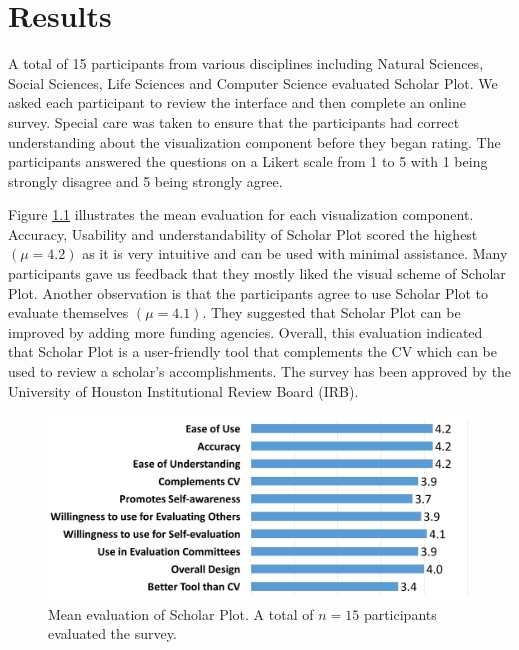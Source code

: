 \chapter{Results}\label{chap:Results}

A total of 15 participants from various disciplines including Natural Sciences, Social Sciences, Life Sciences and Computer Science evaluated Scholar Plot. We asked each participant to review the interface and then complete an online survey. Special care was taken to ensure that the participants had correct understanding about the visualization component before they began rating. The participants answered the questions on a Likert scale from 1 to 5 with 1 being strongly disagree and 5 being strongly agree.

Figure \ref{fig:UserStudy} illustrates the mean evaluation for each visualization component. Accuracy, Usability and understandability of Scholar Plot scored the highest $(\mu = 4.2)$ as it is very intuitive and can be used with minimal assistance. Many participants gave us feedback that they mostly liked the visual scheme of Scholar Plot. Another observation is that the participants agree to use Scholar Plot to evaluate themselves $(\mu = 4.1)$. They suggested that Scholar Plot can be improved by adding more funding agencies. Overall, this evaluation indicated that Scholar Plot is a user-friendly tool that complements the CV which can be used to review a scholar's accomplishments. The survey has been approved by the University of Houston Institutional Review Board (IRB).
 
 \begin{figure}[!htb]
  \centering
  \includegraphics[width=\columnwidth]{figures/fig_survey_chart}
  \caption{Mean evaluation of Scholar Plot. A total of $n=15$ participants evaluated the survey.}
  \label{fig:UserStudy} 
\end{figure}